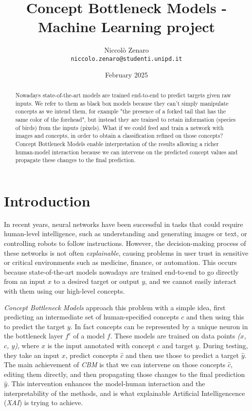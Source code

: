 \documentclass[10pt, twocolumn, letterpaper]{article}
\begin{document}
\title{Concept Bottleneck Models - Machine Learning project}
\author{Niccolò Zenaro\\
{\tt\small niccolo.zenaro@studenti.unipd.it}
}
\date{February 2025}
\maketitle

\begin{abstract}
    Nowadays state-of-the-art models are trained end-to-end to predict targets given raw inputs. We refer to them as black box models because they can't simply manipulate concepts as we intend them, for example "the presence of a forked tail that has the same color of the forehead", but instead they are trained to retain information (species of birds) from the inputs (pixels). What if we could feed and train a network with images and concepts, in order to obtain a classification refined on those concepts? Concept Bottleneck Models enable interpretation of the results allowing a richer human-model interaction because we can intervene on the predicted concept values and propagate these changes to the final prediction.  
    
\end{abstract}

\section{Introduction}
In recent years, neural networks have been successful in tasks that could require human-level intelligence, such as understanding and generating images or text, or controlling robots to follow instructions. However, the decision-making process of these networks is not often \textit{explainable}, causing problems in user trust in sensitive or critical environments such as medicine, finance, or automation. This occurs because state-of-the-art models nowadays are trained end-to-end to go directly from an input $x$ to a desired target or output $y$, and we cannot easily interact with them using our high-level concepts. 

\textit{Concept Bottleneck Models} approach this problem with a simple idea, first predicting an intermediate set of human-specified concepts $c$ and then using this to predict the target $y$. In fact concepts can be represented by a unique neuron in the bottleneck layer ${f^c}$ of a model $f$. These models are trained on data points \textit{($x$, $c$, $y$)}, where $x$ is the input annotated with concept $c$ and target $y$. During testing, they take an input $x$, predict concepts ${\hat{c}}$ and then use those to predict a target ${\hat{y}}$. The main achievement of \textit{CBM} is that we can intervene on those concepts ${\hat{c}}$, editing them directly, and then propagating those changes to the final prediction ${\hat{y}}$. This intervention enhances the model-human interaction and the interpretability of the methods, and is what explainable Artificial Intelligencence (\textit{XAI}) is trying to achieve.
\end{document}
